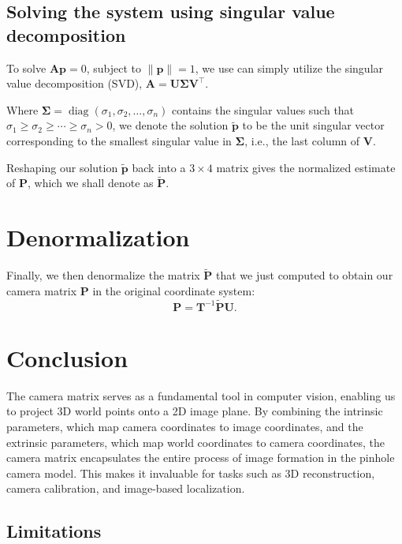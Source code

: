 \documentclass[12pt]{article}
\begin{document}
\subsection{Solving the system using singular value decomposition}

To solve $ \mathbf{A} \mathbf{p} = 0 $, subject to $ \| \mathbf{p} \| = 1 $, we use can simply utilize the singular value decomposition (SVD), $\mathbf{A} = \mathbf{U} \mathbf{\Sigma} \mathbf{V}^\top$.

Where $\mathbf{\Sigma}=\operatorname{diag}(\sigma_1, \sigma_2, \ldots, \sigma_n)$ contains the singular values such that $\sigma_1 \ge \sigma_2 \ge \cdots \ge \sigma_n > 0$, we denote the solution $ \tilde{\mathbf{p}} $ to be the unit singular vector corresponding to the smallest singular value in $ \mathbf{\Sigma} $, i.e., the last column of $ \mathbf{V}$.

Reshaping our solution $\tilde{\mathbf{p}}$ back into a $3 \times 4$ matrix gives the normalized estimate of $\mathbf{P}$, which we shall denote as $\tilde{\mathbf{P}}$.

\section{Denormalization}

Finally, we then denormalize the matrix $\tilde{\mathbf{P}}$ that we just computed to obtain our camera matrix $ \mathbf{P} $ in the original coordinate system:
$$
\mathbf{P} = \mathbf{T}^{-1} \tilde{\mathbf{P}} \mathbf{U}.
$$

\section{Conclusion}

The camera matrix serves as a fundamental tool in computer vision, enabling us to project 3D world points onto a 2D image plane. By combining the intrinsic parameters, which map camera coordinates to image coordinates, and the extrinsic parameters, which map world coordinates to camera coordinates, the camera matrix encapsulates the entire process of image formation in the pinhole camera model. This makes it invaluable for tasks such as 3D reconstruction, camera calibration, and image-based localization.

\subsection{Limitations}
\end{document}
